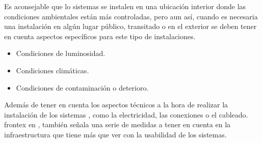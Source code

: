 Es aconsejable que lo sistemas se instalen en una ubicación interior donde las condiciones ambientales están más controladas, pero aun así, cuando es necesaria una instalación en algún lugar público, transitado o en el exterior se deben tener en cuenta aspectos específicos para este tipo de instalaciones.

\begin{itemize}
    \item 
    Condiciones de luminosidad.
    \item
    Condiciones climáticas.
    \item
    Condiciones de contaminación o deterioro.
\end{itemize}
    
Además de tener en cuenta los aspectos técnicos a la hora de realizar la instalación de los sistemas , como la electricidad, las conexiones o el cableado. \Gls{frontex} en \cite{FRONTEX2016OpeReport}, también señala una serie de medidas a tener en cuenta en la infraestructura que tiene más que ver con la usabilidad de los sistemas.

